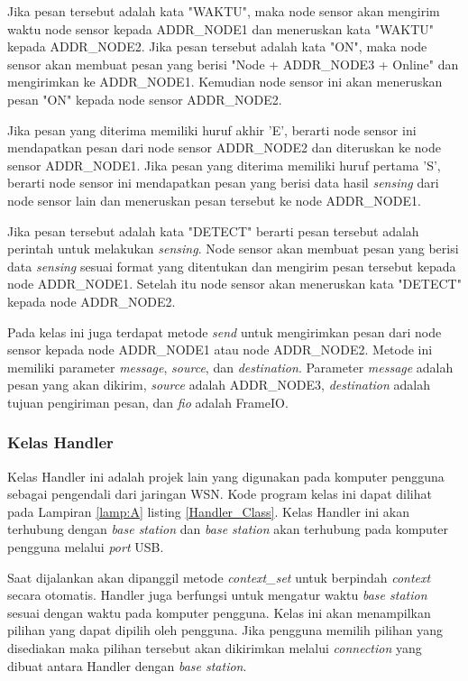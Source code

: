 Jika pesan tersebut adalah kata "WAKTU", maka node sensor akan mengirim waktu node sensor kepada ADDR\_NODE1 dan meneruskan kata "WAKTU" kepada ADDR\_NODE2. Jika pesan tersebut adalah kata "ON", maka node sensor akan membuat pesan yang berisi "Node + ADDR\_NODE3 + Online" dan mengirimkan ke ADDR\_NODE1. Kemudian node sensor ini akan meneruskan pesan "ON" kepada node sensor ADDR\_NODE2.

Jika pesan yang diterima memiliki huruf akhir 'E', berarti node sensor ini mendapatkan pesan dari node sensor ADDR\_NODE2 dan diteruskan ke node sensor ADDR\_NODE1. Jika pesan yang diterima memiliki huruf pertama 'S', berarti node sensor ini mendapatkan pesan yang berisi data hasil \textit{sensing} dari node sensor lain dan meneruskan pesan tersebut ke node ADDR\_NODE1.

Jika pesan tersebut adalah kata "DETECT" berarti pesan tersebut adalah perintah untuk melakukan \textit{sensing}. Node sensor akan membuat pesan yang berisi data \textit{sensing} sesuai format yang ditentukan dan mengirim pesan tersebut kepada node ADDR\_NODE1. Setelah itu node sensor akan meneruskan kata "DETECT" kepada node ADDR\_NODE2.

Pada kelas ini juga terdapat metode \textit{send} untuk mengirimkan pesan dari node sensor kepada node ADDR\_NODE1 atau node ADDR\_NODE2. Metode ini memiliki parameter \textit{message}, \textit{source}, dan \textit{destination}. Parameter \textit{message} adalah pesan yang akan dikirim, \textit{source} adalah ADDR\_NODE3, \textit{destination} adalah tujuan pengiriman pesan, dan \textit{fio} adalah FrameIO.

\subsubsection{Kelas Handler}
Kelas Handler ini adalah projek lain yang digunakan pada komputer pengguna sebagai pengendali dari jaringan WSN. Kode program kelas ini dapat dilihat pada Lampiran \ref{lamp:A} listing \ref{Handler_Class}. Kelas Handler ini akan terhubung dengan \textit{base station} dan \textit{base station} akan terhubung pada komputer pengguna melalui \textit{port} USB.

Saat dijalankan akan dipanggil metode \textit{context\_set} untuk berpindah \textit{context} secara otomatis. Handler juga berfungsi untuk mengatur waktu \textit{base station} sesuai dengan waktu pada komputer pengguna. Kelas ini akan menampilkan pilihan yang dapat dipilih oleh pengguna. Jika pengguna memilih pilihan yang disediakan maka pilihan tersebut akan dikirimkan melalui \textit{connection} yang dibuat antara Handler dengan \textit{base station}. 

